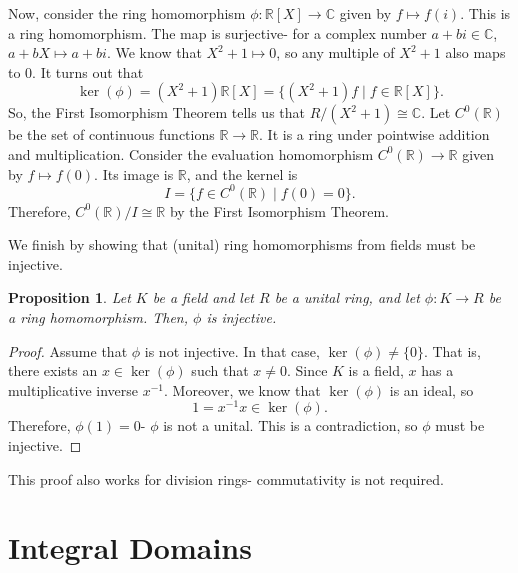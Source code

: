 \documentclass[a4paper, openany]{memoir}
\theoremstyle{definition}
\theoremstyle{plain}
\newtheorem{proposition}[definition]{Proposition}
\begin{document}
Now, consider the ring homomorphism $\phi: \mathbb{R}[X] \to \mathbb{C}$ given by $f \mapsto f(i)$. This is a ring homomorphism. The map is surjective- for a complex number $a + bi \in \mathbb{C}$, $a + bX \mapsto a + bi$. We know that $X^2+1 \mapsto 0$, so any multiple of $X^2+1$ also maps to 0. It turns out that 
\[\ker (\phi) = (X^2 + 1) \mathbb{R}[X] = \{(X^2 + 1)f \mid f \in \mathbb{R}[X]\}.\]
So, the First Isomorphism Theorem tells us that $R/(X^2 + 1) \cong \mathbb{C}$. Let $C^0(\mathbb{R})$ be the set of continuous functions $\mathbb{R} \to \mathbb{R}$. It is a ring under pointwise addition and multiplication. Consider the evaluation homomorphism $C^0(\mathbb{R}) \to \mathbb{R}$ given by $f \mapsto f(0)$. Its image is $\mathbb{R}$, and the kernel is
\[I = \{f \in C^0(\mathbb{R}) \mid f(0) = 0\}.\]
Therefore, $C^0(\mathbb{R})/I \cong \mathbb{R}$ by the First Isomorphism Theorem.

We finish by showing that (unital) ring homomorphisms from fields must be injective.
\begin{proposition}
Let $K$ be a field and let $R$ be a unital ring, and let $\phi: K \to R$ be a ring homomorphism. Then, $\phi$ is injective.
\end{proposition}
\begin{proof}
Assume that $\phi$ is not injective. In that case, $\ker (\phi) \neq \{0\}$. That is, there exists an $x \in \ker (\phi)$ such that $x \neq 0$. Since $K$ is a field, $x$ has a multiplicative inverse $x^{-1}$. Moreover, we know that $\ker (\phi)$ is an ideal, so
\[1 = x^{-1}x \in \ker (\phi).\]
Therefore, $\phi(1) = 0$- $\phi$ is not a unital. This is a contradiction, so $\phi$ must be injective.
\end{proof}
\noindent This proof also works for division rings- commutativity is not required.

\newpage

\section{Integral Domains}
\end{document}
